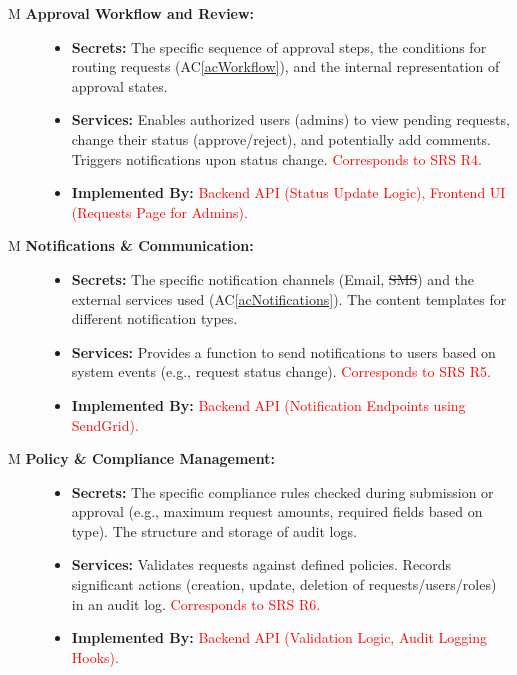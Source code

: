 \documentclass[12pt, titlepage]{article}
\newcommand{\acref}[1]{AC\ref{#1}}
\newcounter{mnum}
\newcommand{\mthemnum}{M\themnum}
\begin{document}
\begin{description}
\item[ \mthemnum \label{mApproval} \textbf{Approval Workflow and Review:}]
    \begin{itemize}
        \item \textbf{Secrets:} The specific sequence of approval steps, the conditions for routing requests (\acref{acWorkflow}), and the internal representation of approval states.
        \item \textbf{Services:} Enables authorized users (admins) to view pending requests, change their status (approve/reject), and potentially add comments. Triggers notifications upon status change. \textcolor{red}{Corresponds to SRS R4.}
        \item \textbf{Implemented By:} \textcolor{red}{Backend API (Status Update Logic), Frontend UI (Requests Page for Admins).}
    \end{itemize}

\item[ \mthemnum \label{mNotify} \textbf{Notifications \& Communication:}]
    \begin{itemize}
        \item \textbf{Secrets:} The specific notification channels (Email, \sout{SMS}) and the external services used (\acref{acNotifications}). The content templates for different notification types.
        \item \textbf{Services:} Provides a function to send notifications to users based on system events (e.g., request status change). \textcolor{red}{Corresponds to SRS R5.}
        \item \textbf{Implemented By:} \textcolor{red}{Backend API (Notification Endpoints using SendGrid).}
    \end{itemize}

\item[ \mthemnum \label{mCompliance} \textbf{Policy \& Compliance Management:}]
    \begin{itemize}
        \item \textbf{Secrets:} The specific compliance rules checked during submission or approval (e.g., maximum request amounts, required fields based on type). The structure and storage of audit logs.
        \item \textbf{Services:} Validates requests against defined policies. Records significant actions (creation, update, deletion of requests/users/roles) in an audit log. \textcolor{red}{Corresponds to SRS R6.}
        \item \textbf{Implemented By:} \textcolor{red}{Backend API (Validation Logic, Audit Logging Hooks).}
    \end{itemize}


\end{description}
\end{document}
